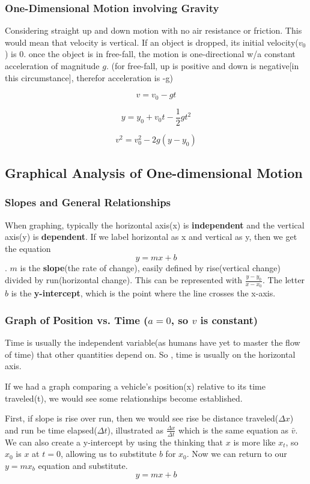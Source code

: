 \documentclass{article}
\begin{document}
\subsubsection{One-Dimensional Motion involving Gravity}
Considering straight up and down motion with no air resistance or friction. This would mean that velocity is vertical. If an object is dropped, its initial velocity($v_0$) is 0. once the object is in free-fall, the motion is one-directional w/a constant acceleration of magnitude $g$. (for free-fall, up is positive and down is negative[in this circumstance], therefor acceleration is -g)

\[ v = v_0 - gt\]

\[y = y_0 + v_0 t - \frac{1}{2}gt^2\]

\[v^2 = v_0^2 - 2g(y - y_0)\]

\subsection{Graphical Analysis of One-dimensional Motion}
\subsubsection{Slopes and General Relationships}
When graphing, typically the horizontal axis(x) is \textbf{independent} and the vertical axis(y) is \textbf{dependent}. If we label horizontal as x and vertical as y, then we get the equation
\[y=mx+b\].
$m$ is the \textbf{slope}(the rate of change), easily defined by rise(vertical change) divided by run(horizontal change). This can be represented with $\frac{y - y_0}{x - x_0}$. The letter $b$ is the \textbf{y-intercept}, which is the point where the line crosses the x-axis.

\subsubsection{Graph of Position vs. Time ($a=0$, so $v$ is constant)}
Time is usually the independent variable(as humans have yet to master the flow of time) that other quantities depend on. So , time is usually on the horizontal axis.

If we had a graph comparing a vehicle's position(x) relative to its time traveled(t), we would see some relationships become established.

First, if slope is rise over run, then we would see rise be distance traveled($\Delta{x}$) and run be time elapsed($\Delta{t}$), illustrated as $\frac{\Delta{x}}{\Delta{t}}$ which is the same equation as $\bar{v}$. We can also create a y-intercept by using the thinking that $x$ is more like $x_t$, so $x_0$ is $x$ at $t=0$, allowing us to substitute $b$ for $x_0$. Now we can return to our $y=mx_b$ equation and substitute.
\[y=mx+b\]
\end{document}
